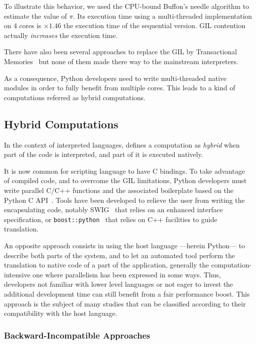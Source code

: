 \documentclass{sigplanconf}
\begin{document}
To illustrate this behavior, we used the CPU-bound Buffon's needle algorithm to
estimate the value of $\pi$. Its execution time using a multi-threaded
implementation on 4 cores is $\times 1.46$ the execution time of the sequential
version. GIL contention actually \emph{increases} the execution time.

There have also been several approaches to replace the GIL by Transactional
Memories~\cite{Riley2006,Tabba2010} but none of them made there way to the
mainstream interpreters.

As a consequence, Python developers need to write multi-threaded native
modules in order to fully benefit from multiple cores. This leads to a kind of
computations referred as hybrid computations.


\subsection{Hybrid Computations}

In the context of interpreted languages, \cite{dongara2007} defines a computation
as \emph{hybrid} when part of the code is interpreted, and part of it is
executed natively.

It is now common for scripting language to have C bindings. To take advantage of
compiled code, and to overcome the GIL limitations, Python developers must write
parallel C/C++ functions and the associated boilerplate based on the Python C
API~\cite{pythoncapi}. Tools have been developed to relieve the user from
writing the encapsulating code, notably SWIG~\cite{swig2003} that relies on an
enhanced interface specification, or
\texttt{boost::python}~\cite{boostpython2007} that relies on C++ facilities to
guide translation.

An opposite approach consists in using the host language ---herein Python--- to
describe both parts of the system, and to let an automated tool perform the
translation to native code of a part of the application, generally the
computation-intensive one where parallelism has been expressed in some ways.
Thus, developers not familiar with lower level languages or not eager to invest
the additional development time can still benefit from a fair performance boost.
This approach is the subject of many studies that can be classified according to
their compatibility with the host language.

\subsubsection{Backward-Incompatible Approaches}
\end{document}
